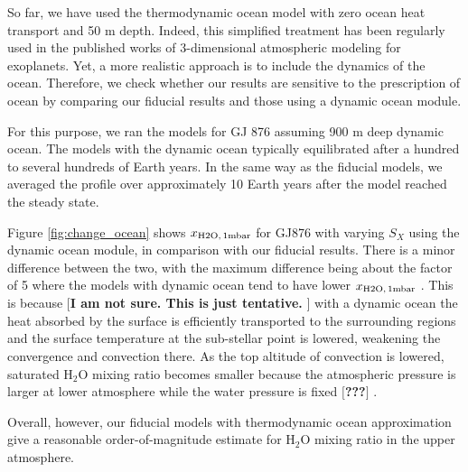 \documentclass[11pt,numberedappendix,twocolappendix,]{emulateapj}
\def\water{H$_2$O }
\def\xwater{$x_{\rm H2O,\,1mbar}$ }
\def\memo#1{\color{red}$[${\bf #1}$]$ \color{black}}
\begin{document}
So far, we have used the thermodynamic ocean model with zero ocean heat transport and 50 m depth. 
Indeed, this simplified treatment has been regularly used in the published works of 3-dimensional atmospheric modeling for exoplanets. 
Yet, a more realistic approach is to include the dynamics of the ocean. 
Therefore, we check whether our results are sensitive to the prescription of ocean by comparing our fiducial results and those using a dynamic ocean module. 

For this purpose, we ran the models for GJ 876 assuming 900 m deep dynamic ocean. 
The models with the dynamic ocean typically equilibrated after a hundred to several hundreds of Earth years. 
In the same way as the fiducial models, we averaged the profile over approximately 10 Earth years after the model reached the steady state. 

Figure \ref{fig:change_ocean} shows \xwater for GJ876 with varying $S_X$ using the dynamic ocean module, in comparison with our fiducial results.  
There is a minor difference between the two, with the maximum difference being about the factor of 5 where the models with dynamic ocean tend to have lower \xwater. 
This is because \memo{I am not sure. This is just tentative. } with a dynamic ocean the heat absorbed by the surface is efficiently transported to the surrounding regions and the surface temperature at the sub-stellar point is lowered, weakening the convergence and convection there.
As the top altitude of convection is lowered, saturated \water mixing ratio becomes smaller because the atmospheric pressure is larger at lower atmosphere while the water pressure is fixed \memo{???}. 

Overall, however, our fiducial models with thermodynamic ocean approximation give a reasonable order-of-magnitude estimate for \water mixing ratio in the upper atmosphere. 
\end{document}
